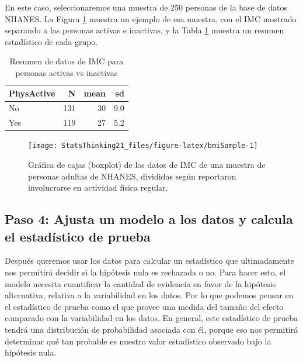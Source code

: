 \documentclass[
  12pt,
]{book}
\begin{document}
En este caso, seleccionaremos una muestra de 250 personas de la base de datos NHANES. La Figura \ref{fig:bmiSample} muestra un ejemplo de esa muestra, con el IMC mostrado separando a las personas activas e inactivas, y la Tabla \ref{tab:summaryTable} muestra un resumen estadístico de cada grupo.

\begin{table}

\caption{\label{tab:summaryTable}Resumen de datos de IMC para personas activas vs inactivas}
\centering
\begin{tabular}[t]{l|r|r|r}
\hline
PhysActive & N & mean & sd\\
\hline
No & 131 & 30 & 9.0\\
\hline
Yes & 119 & 27 & 5.2\\
\hline
\end{tabular}
\end{table}

\begin{figure}
\texttt{[image: StatsThinking21\_files/figure-latex/bmiSample-1]} \caption{Gráfica de cajas (boxplot) de los datos de IMC de una muestra de personas adultas de NHANES, divididas según reportaron involucrarse en actividad física regular.}\label{fig:bmiSample}
\end{figure}

\hypertarget{paso-4-ajusta-un-modelo-a-los-datos-y-calcula-el-estaduxedstico-de-prueba}{%
\subsection{Paso 4: Ajusta un modelo a los datos y calcula el estadístico de prueba}\label{paso-4-ajusta-un-modelo-a-los-datos-y-calcula-el-estaduxedstico-de-prueba}}

Después queremos usar los datos para calcular un estadístico que ultimadamente nos permitirá decidir si la hipótesis nula es rechazada o no. Para hacer esto, el modelo necesita cuantificar la cantidad de evidencia en favor de la hipótesis alternativa, relativa a la variabilidad en los datos. Por lo que podemos pensar en el estadístico de prueba como el que provee una medida del tamaño del efecto comparado con la variabilidad en los datos. En general, este estadístico de prueba tendrá una distribución de probabilidad asociada con él, porque eso nos permitirá determinar qué tan probable es nuestro valor estadístico observado bajo la hipótesis nula.
\end{document}
